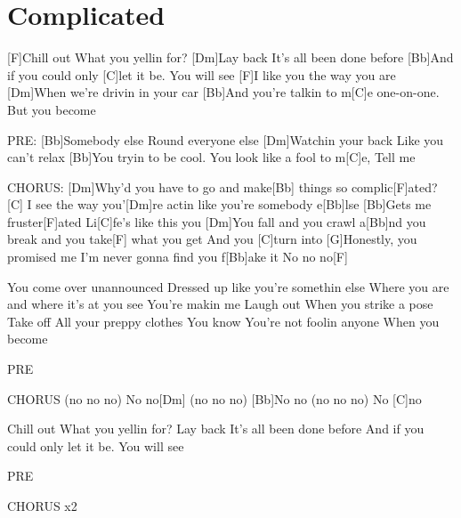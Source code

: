 \section{Complicated}
\begin{multicols}{2}
\begin{guitar}
[Dm Bb F C]{}

[F]Chill out What you yellin for?
[Dm]Lay back  It's all been done before
[Bb]And if you could only [C]let it be. You will see
[F]I like you the way you are
[Dm]When we're drivin in your car
[Bb]And you're talkin to m[C]e one-on-one. 
But you become


PRE:
[Bb]Somebody else Round everyone else
[Dm]Watchin your back Like you can't relax
[Bb]You tryin to be cool. You look like a fool to m[C]e, 
Tell me


CHORUS:
[Dm]Why'd you have to go and make[Bb]{}
things so complic[F]ated? [C]{}
I see the way you'[Dm]re actin like you're somebody e[Bb]lse
[Bb]Gets me fruster[F]ated Li[C]fe's like this you
[Dm]You fall and you crawl a[Bb]nd you break and 
you take[F] what you get  And you [C]turn into
[G]Honestly, you promised me
I'm never gonna find you f[Bb]ake it No no no[F]{}


You come over unannounced
Dressed up like you're somethin else
Where you are and where it's at you see 
You're makin me Laugh out When you strike a pose
Take off All your preppy clothes
You know You're not foolin anyone
When you become


PRE


CHORUS
(no no no) No no[Dm] (no no no)
[Bb]No no (no no no) No [C]no


Chill out What you yellin for?
Lay back It's all been done before
And if you could only let it be. You will see


PRE


CHORUS x2
\end{guitar}
\end{multicols}
